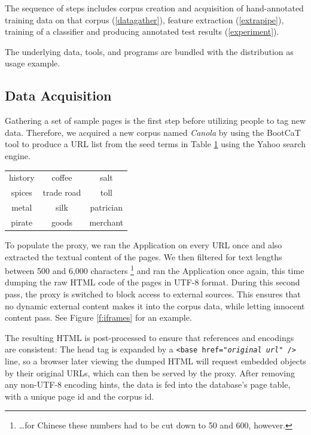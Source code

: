 The sequence of steps includes
corpus creation and acquisition of hand-annotated training data on that corpus (\ref{datagather}), 
feature extraction (\ref{extrapipe}), 
training of a classifier and producing annotated test results (\ref{experiment}).

The underlying data, tools, and programs are bundled with the {\KrdWrd} distribution as usage example.


\subsection{Data Acquisition\label{datagather}}

Gathering a set of sample pages is the first step before utilizing people to tag new data.
Therefore, we acquired a new corpus named \textit{Canola} by using the BootCaT \cite{bootcat} tool to produce a URL list from the seed terms in Table \ref{t:seed} using the Yahoo search engine. 

\begin{table}
\centering
{}
\begin{tabular}[h]{ccc}
        history
&        coffee 
&        salt \\
        spices 
&        trade road
&        toll \\
        metal
&        silk 
&        patrician \\
        pirate 
&        goods
&        merchant 
\end{tabular}
\label{t:seed}
\end{table}

To populate the proxy, we ran the Application on every URL once and also extracted the textual content of the pages.
We then filtered for text lengths between 500 and 6,000 characters \footnote{\ldots for Chinese these numbers had to be cut down to 50 and 600, however.} and ran the Application once again, this time dumping the raw HTML code of the pages in UTF-8 format.
During this second pass, the proxy is switched to block access to external sources.
This ensures that no dynamic external content makes it into the corpus data, while letting innocent content pass.
See Figure \ref{f:iframes} for an example.

The resulting HTML is post-processed to ensure that references and encodings are consistent:
The head tag is expanded by a \texttt{<base href="\textit{original url}" />} line, so a browser later viewing the dumped HTML will request embedded objects by their original URLs, which can then be served by the proxy.
After removing any non-UTF-8 encoding hints, the data is fed into the database's page table, with a unique page id and the corpus id.

